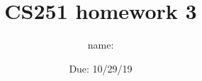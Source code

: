 \documentclass{exam}
\title{CS251 homework 3}
\author{name:\underline{\hspace{2in}}}
\date{Due: 10/29/19}
\def\land{\wedge}           %
\def\lor{\vee}              %
\def\lnot{\neg}             %
\def\T{\top}                %
\def\F{\bot}                %
\begin{document}
\maketitle


\newcommand{\premise}    [1]{\AxiomC{#1}}
\newcommand{\assumption} [1]{\AxiomC{[#1]}}
\newcommand{\andI}       [1]{\RightLabel{$\land I$}   \BinaryInfC{#1} }
\newcommand{\andEL}      [1]{\RightLabel{$\land E1$}  \UnaryInfC{#1}  }
\newcommand{\andER}      [1]{\RightLabel{$\land E2$}  \UnaryInfC{#1}  }
\newcommand{\orIL}       [1]{\RightLabel{$\lor I1$}   \UnaryInfC{#1}  }
\newcommand{\orIR}       [1]{\RightLabel{$\lor I2$}   \UnaryInfC{#1}  }
\newcommand{\orE}        [1]{\RightLabel{$\lor E$}    \TrinaryInfC{#1}}
\newcommand{\arrowI}     [1]{\RightLabel{$\to I$}     \BinaryInfC{#1} }
\newcommand{\arrowE}     [1]{\RightLabel{$\to E$}     \BinaryInfC{#1} }
\newcommand{\notE}       [1]{\RightLabel{$\lnot E$}   \BinaryInfC{#1} }
\newcommand{\notI}       [1]{\RightLabel{$\lnot I$}   \UnaryInfC{#1}  }
\newcommand{\FE}         [1]{\RightLabel{$\F E$}      \UnaryInfC{#1}  }
\newcommand{\TI}         [1]{\RightLabel{$\T I$}      \UnaryInfC{#1}  }
\newcommand{\LEM}        [1]{\RightLabel{$LEM$}       \UnaryInfC{#1}  }
\newcommand{\DLL}        [1]{\RightLabel{$DL1$}       \UnaryInfC{#1}  }
\newcommand{\DLR}        [1]{\RightLabel{$DL2$}       \UnaryInfC{#1}  }
\newcommand{\notNotE}    [1]{\RightLabel{$\lnot \lnot E$} \UnaryInfC{#1} }
\newcommand{\ForI}       [1]{\RightLabel{$\forall I$} \BinaryInfC{#1}}
\newcommand{\ForE}       [1]{\RightLabel{$\forall E$} \UnaryInfC{#1} }
\newcommand{\ExI}        [1]{\RightLabel{$\exists I$} \UnaryInfC{#1} }
\newcommand{\ExE}        [1]{\RightLabel{$\exists E$} \BinaryInfC{#1}}
\newcommand{\refl}       [1]{\premise{$\ $}\RightLabel{$Refl$}      \UnaryInfC{#1}   }
\newcommand{\eqEL}       [1]{\RightLabel{$=E1$}                     \BinaryInfC{#1}  }
\newcommand{\eqER}       [1]{\RightLabel{$=E2$}                     \BinaryInfC{#1}  }



%
%
%
\end{document}
